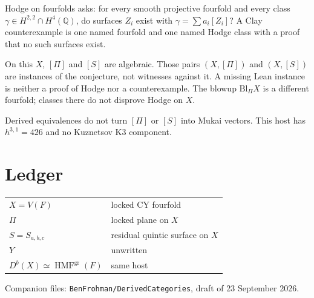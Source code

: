 \documentclass[11pt]{article}
\theoremstyle{definition}
\theoremstyle{remark}
\begin{document}
Hodge on fourfolds asks: for every smooth projective fourfold and every class \(\gamma\in H^{2,2}\cap H^4(\mathbb{Q})\), do surfaces \(Z_i\) exist with \(\gamma=\sum a_i[Z_i]\)? A Clay counterexample is one named fourfold and one named Hodge class with a proof that no such surfaces exist.

On this \(X\), \([\Pi]\) and \([S]\) are algebraic. Those pairs \((X,[\Pi])\) and \((X,[S])\) are instances of the conjecture, not witnesses against it. A missing Lean instance is neither a proof of Hodge nor a counterexample. The blowup \(\mathrm{Bl}_\Pi X\) is a different fourfold; classes there do not disprove Hodge on \(X\).

Derived equivalences do not turn \([\Pi]\) or \([S]\) into Mukai vectors. This host has \(h^{3,1}=426\) and no Kuznetsov K3 component.

\section{Ledger}

\begin{center}
\begin{tabular}{ll}
\(X=V(F)\) & locked CY fourfold\\
\(\Pi\) & locked plane on \(X\)\\
\(S=S_{a,b,c}\) & residual quintic surface on \(X\)\\
\(Y\) & unwritten\\
\(D^b(X)\simeq\operatorname{HMF}^{\mathrm{gr}}(F)\) & same host\\
\end{tabular}
\end{center}

Companion files: \texttt{BenFrohman/DerivedCategories}, draft of 23 September 2026.
\end{document}
